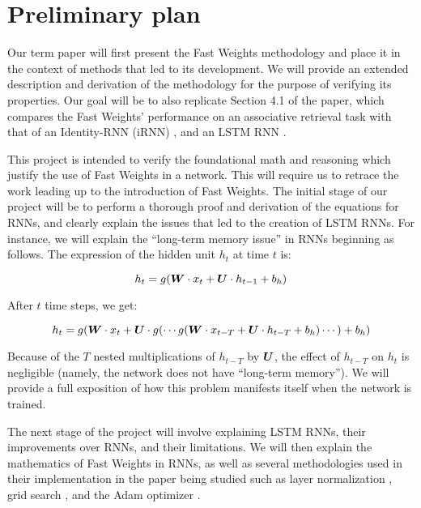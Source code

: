 \section{Preliminary plan}

Our term paper will first present the Fast Weights methodology and place it in the context of methods that led to its development. We will provide an extended description and derivation of the methodology for the purpose of verifying its properties. Our goal will be to also replicate Section 4.1 of the paper, which compares the Fast Weights' performance on an associative retrieval task with that of an Identity-RNN (iRNN) \cite{DBLP:journals/corr/TalathiV15}, and an LSTM RNN \cite{DBLP:conf/nips/BaHMLI16}.

This project is intended to verify the foundational math and reasoning which justify the use of Fast Weights in a network. This will require us to retrace the work leading up to the introduction of Fast Weights. The initial stage of our project will be to perform a thorough proof and derivation of the equations for RNNs, and clearly explain the issues that led to the creation of LSTM RNNs. For instance, we will explain the ``long-term memory issue'' in RNNs beginning as follows. The expression of the hidden unit $h_t$ at time $t$ is:

\begin{equation*}
  h_t = g(\boldsymbol{W} \cdot x_t + \boldsymbol{U} \cdot h_{t-1} + b_h)
\end{equation*}

After $t$ time steps, we get:

\begin{equation*}
  h_t = g(\boldsymbol{W} \cdot x_t + \boldsymbol{U} \cdot g(\cdots g(\boldsymbol{W} \cdot x_{t-T} + \boldsymbol{U} \cdot h_{t-T} + b_h) \cdots) + b_h)
\end{equation*}

Because of the $T$ nested multiplications of $h_{t-T}$ by $\boldsymbol{U}$, the effect of $h_{t-T}$ on $h_t$ is negligible (namely, the network does not have ``long-term memory''). We will provide a full exposition of how this problem manifests itself when the network is trained.

The next stage of the project will involve explaining LSTM RNNs, their improvements over RNNs, and their limitations. We will then explain the mathematics of Fast Weights in RNNs, as well as several methodologies used in their implementation in the paper being studied such as layer normalization \cite{DBLP:journals/corr/BaKH16}, grid search \cite{Goodfellow-et-al-2016}, and the Adam optimizer \cite{DBLP:journals/corr/KingmaB14}.

